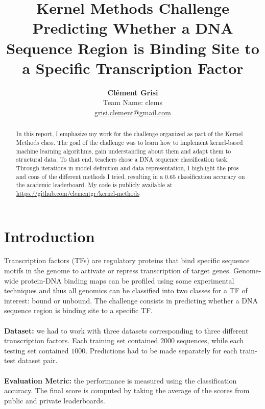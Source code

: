 \documentclass[final]{cvpr}
\begin{document}
	
	\title{ Kernel Methods Challenge\\
		\vspace{1mm}
		\large \normalfont Predicting Whether a DNA Sequence Region is Binding Site to a Specific Transcription Factor}
	
	\author{\textbf{Clément Grisi}\\
		Team Name: clems\\
		\small \url{grisi.clement@gmail.com}
	}
	
	\maketitle
	
	\begin{abstract}
		In this report, I emphasize my work for the challenge organized as part of the Kernel Methods class. The goal of the challenge was to learn how to implement kernel-based machine learning algorithms, gain understanding about them and adapt them to structural data. To that end, teachers chose a DNA sequence classification task. Through iterations in model definition and data representation, I highlight the pros and cons of the different methods I tried, resulting in a $0.65$ classification accuracy on the academic leaderboard. My code is publicly available at \small{\url{https://github.com/clementgr/kernel-methods}}
	\end{abstract}
	
	\vspace{-3mm}
	
	\section{Introduction}
	
	Transcription factors (TFs) are regulatory proteins that bind specific sequence motifs in the genome to activate or repress transcription of target genes. Genome-wide protein-DNA binding maps can be profiled using some experimental techniques and thus all genomics can be classified into two classes for a TF of interest: bound or unbound. The challenge consists in predicting whether a DNA sequence region is binding site to a specific TF.\\
	\\
	\textbf{Dataset:} we had to work with three datasets corresponding to three different transcription factors. Each training set contained $2000$ sequences, while each testing set contained $1000$. Predictions had to be made separately for each train-test dataset pair.\\
	\\
	\textbf{Evaluation Metric:} the performance is measured using the classification accuracy. The final score is computed by taking the average of the scores from public and private leaderboards.
	
\end{document}
